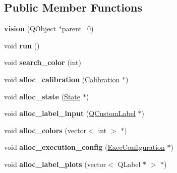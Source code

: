 \subsection*{Public Member Functions}
\begin{DoxyCompactItemize}
\item 
\hypertarget{classvision_a81ffb3d1b91453b4516bef1ac130b5c4}{{\bfseries vision} (Q\-Object $\ast$parent=0)}\label{classvision_a81ffb3d1b91453b4516bef1ac130b5c4}

\item 
\hypertarget{classvision_ad213bf1ae76ed6a489390c501fe1b4e0}{void {\bfseries run} ()}\label{classvision_ad213bf1ae76ed6a489390c501fe1b4e0}

\item 
\hypertarget{classvision_a908d37e077c8844e2bfd5b38a1f65577}{void {\bfseries search\-\_\-color} (int)}\label{classvision_a908d37e077c8844e2bfd5b38a1f65577}

\item 
\hypertarget{classvision_a81fd57a35d8e331f844e1d276d8272f6}{void {\bfseries alloc\-\_\-calibration} (\hyperlink{structcommon_1_1Calibration}{Calibration} $\ast$)}\label{classvision_a81fd57a35d8e331f844e1d276d8272f6}

\item 
\hypertarget{classvision_a4f8eec2ffc63e3a2b3e76c347b13f537}{void {\bfseries alloc\-\_\-state} (\hyperlink{structcommon_1_1State}{State} $\ast$)}\label{classvision_a4f8eec2ffc63e3a2b3e76c347b13f537}

\item 
\hypertarget{classvision_a5951eb6e1bb8582b3f01dec96d3ad3ac}{void {\bfseries alloc\-\_\-label\-\_\-input} (\hyperlink{classQCustomLabel}{Q\-Custom\-Label} $\ast$)}\label{classvision_a5951eb6e1bb8582b3f01dec96d3ad3ac}

\item 
\hypertarget{classvision_a5d366b880029815afed304c1d2d29bfc}{void {\bfseries alloc\-\_\-colors} (vector$<$ int $>$ $\ast$)}\label{classvision_a5d366b880029815afed304c1d2d29bfc}

\item 
\hypertarget{classvision_a3d623a2e736f204716f1d44bf496823f}{void {\bfseries alloc\-\_\-execution\-\_\-config} (\hyperlink{structcommon_1_1ExecConfiguration}{Exec\-Configuration} $\ast$)}\label{classvision_a3d623a2e736f204716f1d44bf496823f}

\item 
\hypertarget{classvision_a75142dd50f6818ae2d954a1070b7e721}{void {\bfseries alloc\-\_\-label\-\_\-plots} (vector$<$ Q\-Label $\ast$ $>$ $\ast$)}\label{classvision_a75142dd50f6818ae2d954a1070b7e721}


\end{DoxyCompactItemize}
